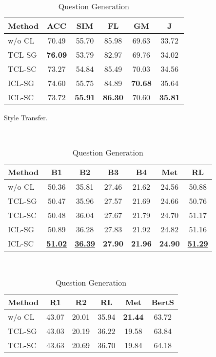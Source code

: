 \begin{table}[t]
\begin{subtable}{\linewidth}
\begin{tabular}{lccccc}
			\hline
			{Method} &  {ACC} & {SIM} & {FL} & {GM} & {J}\\
			\hline
			w/o CL & 70.49 & 55.70 & 85.98 & 69.63 &33.72 \\
			TCL-SG & \textbf{76.09} & 53.79 & 82.97 & 69.76 & 34.02 \\
			\hline
			TCL-SC& 73.27 & 54.84 & 85.49 & 70.03 & 34.56\\
			ICL-SG & 74.60 & 55.75 & 84.89 & \textbf{70.68} & 35.64\\
			ICL-SC & 73.72 & \textbf{55.91} & \textbf{86.30} & \underline{{70.60}} & \underline{\textbf{35.81}} \\
			\hline
		\end{tabular}
		\caption{Style Transfer.}
		\label{tab:end2endst}
	\end{subtable}
	\\[5pt]
	\begin{subtable}{\linewidth}
		\scriptsize
		\centering
		\begin{tabular}{lcccccc}
			\hline
			{Method} & {B1} & {B2} & {B3} & {B4} & {Met} & {RL}\\
			\hline
			w/o CL & {50.36} & 35.81 & 27.46 & 21.62 & 24.56 & 50.88 \\
			TCL-SG &{50.47} & 35.96 & 27.57 & 21.69 & 24.66 & 50.76\\
			\hline
			TCL-SC & 50.48 & 36.04 & 27.67 & 21.79 & 24.70 & 51.17\\
			ICL-SG & 50.89 & 36.28 & 27.83 & 21.92 & 24.82 & 51.16\\
			ICL-SC &  \underline{\textbf{51.02}} & \underline{\textbf{36.39}} & {\textbf{27.90}} & \textbf{21.96} & \textbf{24.90} & \underline{\textbf{51.29}} \\
			\hline
		\end{tabular}
		\caption{Question Generation}
		\label{tab:end2endqg}
	\end{subtable}
	\\[5pt]
	\begin{subtable}{\linewidth}
		\scriptsize
		\centering
		\begin{tabular}{lccccc}
			\hline
			{Method} & {R1} & {R2} & {RL} & {Met} & {BertS}\\
			\hline
			w/o CL &  43.07 & 20.01 & 35.94 & \textbf{21.44} & 63.72 \\
			TCL-SG & 43.03 & 20.19 & 36.22 & 19.58 & 63.84 \\
			\hline
			TCL-SC & 43.63 & 20.69 & 36.70 & 19.84 & 64.18 \\

\end{tabular}
\end{subtable}
\end{table}
